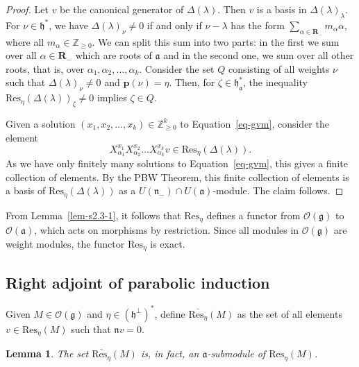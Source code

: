 \documentclass[a4paper]{amsart}
\newtheorem{lemma}[theorem]{Lemma}
\begin{document}
\begin{proof}
Let $v$ be the canonical generator of $\Delta(\lambda)$. Then 
$v$ is a basis in $\Delta(\lambda)_\lambda$. For $\nu\in\mathfrak{h}^*$,
we have $\Delta(\lambda)_\nu\neq 0$ if and only if $\nu-\lambda$
has the form $\displaystyle\sum_{\alpha\in\mathbf{R}_-}m_\alpha\alpha$,
where all $m_\alpha\in\mathbb{Z}_{\geq 0}$. We can split this sum into
two parts: in the first we sum over all $\alpha\in\mathbf{R}_-$
which are roots of $\mathfrak{a}$ and in the second one, we sum
over all other roots, that is, over $\alpha_1,\alpha_2,\dots,\alpha_k$.
Consider the set $Q$ consisting of all weights $\nu$ such that
$\Delta(\lambda)_\nu\neq 0$ and $\mathbf{p}(\nu)=\eta$.
Then, for  $\zeta\in \mathfrak{h}^*_\mathfrak{a}$,  the inequality
$\mathrm{Res}_\eta(\Delta(\lambda))_\zeta\neq 0$
implies $\zeta\in Q$.

Given a solution $(x_1,x_2,\dots,x_k)\in\mathbb{Z}_{\geq 0}^k$
to Equation~\eqref{eq-gvm}, consider the element
\begin{displaymath}
X_{\alpha_1}^{x_1}X_{\alpha_2}^{x_2}\dots X_{\alpha_k}^{x_k}v
\in\mathrm{Res}_\eta(\Delta(\lambda)).
\end{displaymath}
As we have only finitely many solutions to Equation~\eqref{eq-gvm},
this gives a finite collection of elements. By the PBW Theorem,
this finite collection of elements is a basis of 
$\mathrm{Res}_\eta(\Delta(\lambda))$ 
as a $U(\mathfrak{n}_-)\cap U(\mathfrak{a})$-module.
The claim follows.
\end{proof}

From Lemma~\ref{lem-s2.3-1}, it follows that $\mathrm{Res}_\eta$
defines a functor from $\mathcal{O}(\mathfrak{g})$
to $\mathcal{O}(\mathfrak{a})$, which acts on morphisms by restriction.
Since all modules in $\mathcal{O}(\mathfrak{g})$ are weight modules,
the functor $\mathrm{Res}_\eta$ is exact.

\subsection{Right adjoint of parabolic induction}\label{s2.4}

Given $M\in\mathcal{O}(\mathfrak{g})$
and $\eta\in(\mathfrak{h}^\perp)^*$,
define $\overline{\mathrm{Res}_\eta}(M)$
as the set of all elements $v\in \mathrm{Res}_\eta(M)$
such that $\mathfrak{n}v=0$.

\begin{lemma}\label{lem-s2.4-1}
The set $\overline{\mathrm{Res}_\eta}(M)$ is, in fact,
an $\mathfrak{a}$-submodule of $\mathrm{Res}_\eta(M)$.
\end{lemma}
\end{document}
